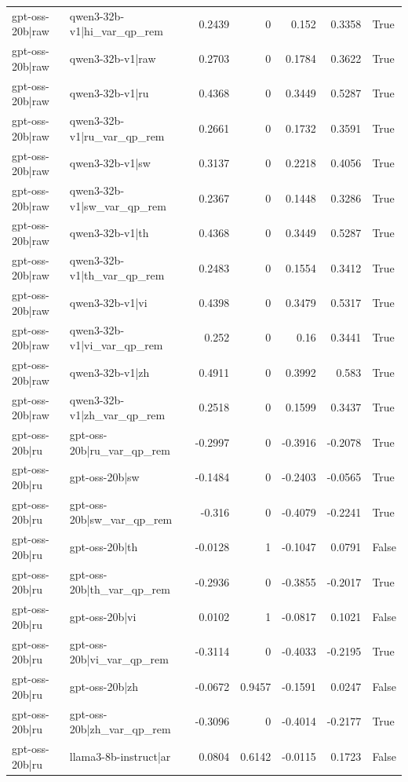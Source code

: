 \begin{table}
\begin{tabular}{l l r r r r l}
gpt-oss-20b|raw & qwen3-32b-v1|hi_var_qp_rem & 0.2439 & 0 & 0.152 & 0.3358 & True \\
gpt-oss-20b|raw & qwen3-32b-v1|raw & 0.2703 & 0 & 0.1784 & 0.3622 & True \\
gpt-oss-20b|raw & qwen3-32b-v1|ru & 0.4368 & 0 & 0.3449 & 0.5287 & True \\
gpt-oss-20b|raw & qwen3-32b-v1|ru_var_qp_rem & 0.2661 & 0 & 0.1732 & 0.3591 & True \\
gpt-oss-20b|raw & qwen3-32b-v1|sw & 0.3137 & 0 & 0.2218 & 0.4056 & True \\
gpt-oss-20b|raw & qwen3-32b-v1|sw_var_qp_rem & 0.2367 & 0 & 0.1448 & 0.3286 & True \\
gpt-oss-20b|raw & qwen3-32b-v1|th & 0.4368 & 0 & 0.3449 & 0.5287 & True \\
gpt-oss-20b|raw & qwen3-32b-v1|th_var_qp_rem & 0.2483 & 0 & 0.1554 & 0.3412 & True \\
gpt-oss-20b|raw & qwen3-32b-v1|vi & 0.4398 & 0 & 0.3479 & 0.5317 & True \\
gpt-oss-20b|raw & qwen3-32b-v1|vi_var_qp_rem & 0.252 & 0 & 0.16 & 0.3441 & True \\
gpt-oss-20b|raw & qwen3-32b-v1|zh & 0.4911 & 0 & 0.3992 & 0.583 & True \\
gpt-oss-20b|raw & qwen3-32b-v1|zh_var_qp_rem & 0.2518 & 0 & 0.1599 & 0.3437 & True \\
gpt-oss-20b|ru & gpt-oss-20b|ru_var_qp_rem & -0.2997 & 0 & -0.3916 & -0.2078 & True \\
gpt-oss-20b|ru & gpt-oss-20b|sw & -0.1484 & 0 & -0.2403 & -0.0565 & True \\
gpt-oss-20b|ru & gpt-oss-20b|sw_var_qp_rem & -0.316 & 0 & -0.4079 & -0.2241 & True \\
gpt-oss-20b|ru & gpt-oss-20b|th & -0.0128 & 1 & -0.1047 & 0.0791 & False \\
gpt-oss-20b|ru & gpt-oss-20b|th_var_qp_rem & -0.2936 & 0 & -0.3855 & -0.2017 & True \\
gpt-oss-20b|ru & gpt-oss-20b|vi & 0.0102 & 1 & -0.0817 & 0.1021 & False \\
gpt-oss-20b|ru & gpt-oss-20b|vi_var_qp_rem & -0.3114 & 0 & -0.4033 & -0.2195 & True \\
gpt-oss-20b|ru & gpt-oss-20b|zh & -0.0672 & 0.9457 & -0.1591 & 0.0247 & False \\
gpt-oss-20b|ru & gpt-oss-20b|zh_var_qp_rem & -0.3096 & 0 & -0.4014 & -0.2177 & True \\
gpt-oss-20b|ru & llama3-8b-instruct|ar & 0.0804 & 0.6142 & -0.0115 & 0.1723 & False \\

\end{tabular}
\end{table}
